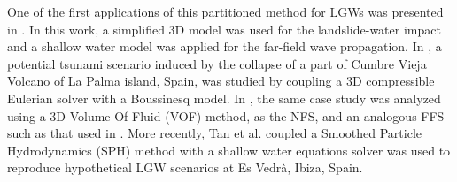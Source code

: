 One of the first applications of this partitioned method for LGWs was presented in \cite{heinrich1998simulation}. In this work, a simplified 3D model was used for the landslide-water impact and a shallow water model was applied for the far-field wave propagation.
In \cite{lovholt2008oceanic}, a potential tsunami scenario induced by the collapse of a part of Cumbre Vieja Volcano of La Palma island, Spain, was studied by coupling a 3D compressible Eulerian solver with a Boussinesq model. In \cite{abadie2012numerical}, the same case study was analyzed using a 3D Volume Of Fluid (VOF) method, as the NFS, and an analogous FFS such as that used in \cite{lovholt2008oceanic}.
More recently, Tan et al. \cite{tan2018numerical} coupled a Smoothed Particle Hydrodynamics (SPH) method with a shallow water equations solver was used to reproduce hypothetical LGW scenarios at Es Vedrà, Ibiza, Spain.




